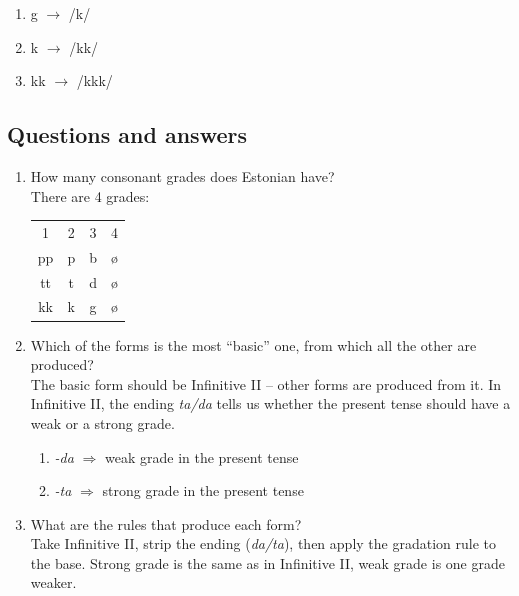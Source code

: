 \documentclass[a4paper, 12pt]{article}
\begin{document}
	\begin{enumerate}[$\cdot$]
		\item g $\rightarrow$ /k/
		\item k $\rightarrow$ /kk/
		\item kk $\rightarrow$ /kkk/
	\end{enumerate}

		\subsection{Questions and answers}
	
\begin{enumerate}[$\gg$]
	\item How many consonant grades does Estonian have?\\
	There are 4 grades:
\begin{table}[H]
\begin{tabular}{cccc}
1  & 2 & 3 & 4 \\
pp & p & b & ø \\
tt & t & d & ø \\
kk & k & g & ø
\end{tabular}
\end{table}
	\item Which of the forms is the most ``basic'' one, from which all the other are produced? \\
		The basic form should be Infinitive II -- other forms are produced from it. In Infinitive II, the ending \emph{ta/da} tells us whether the present tense should have a weak or a strong grade.
		\begin{enumerate}[$\cdot$]
			\item \emph{-da} $\Rightarrow$ weak grade in the present tense
			\item \emph{-ta} $\Rightarrow$ strong grade in the present tense
		\end{enumerate}
	\item What are the rules that produce each form?\\
	Take Infinitive II, strip the ending (\emph{da/ta}), then apply the gradation rule to the base. Strong grade is the same as in Infinitive II, weak grade is one grade weaker.\\
	

\end{enumerate}
\end{document}
